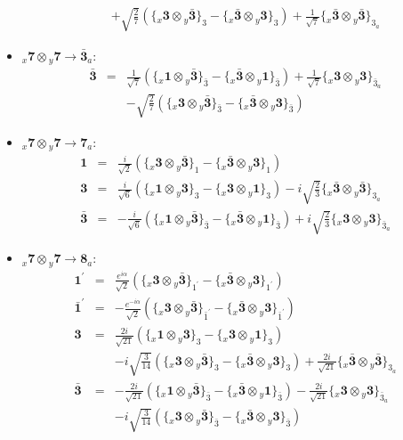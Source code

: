 \documentclass[english]{article}
\newcommand{\rep}[1]{\mathbf{#1}}
\newcommand{\repx}[2]{{}_{#2}\mathbf{#1}}
\newcommand{\subcg}[3]{\big\{ \repx{#1}{x}\otimes\repx{#2}{y}\big\}^{}_{#3}}
\begin{document}
\begin{itemize}
\begin{eqnarray*}
 & & +\sqrt{\frac{2}{7}}\left(\subcg{3}{\bar{3}}{3}-\subcg{\bar{3}}{3}{3}\right)+\frac{1}{\sqrt{7}}\subcg{\bar{3}}{\bar{3}}{3_{a}}
\end{eqnarray*}
\item $\repx{7}{x}\otimes\repx{7}{y}\to\rep{\bar{3}}_{a}$:
\begin{eqnarray*}
\rep{\bar{3}} &=& \frac{1}{\sqrt{7}}\left(\subcg{1}{\bar{3}}{\bar{3}}-\subcg{\bar{3}}{1}{\bar{3}}\right)+\frac{1}{\sqrt{7}}\subcg{3}{3}{\bar{3}_{a}} \\ 
 & & -\sqrt{\frac{2}{7}}\left(\subcg{3}{\bar{3}}{\bar{3}}-\subcg{\bar{3}}{3}{\bar{3}}\right)
\end{eqnarray*}
\item $\repx{7}{x}\otimes\repx{7}{y}\to\rep{7}_{a}$:
\begin{eqnarray*}
\rep{1} &=& \frac{i}{\sqrt{2}}\left(\subcg{3}{\bar{3}}{1}-\subcg{\bar{3}}{3}{1}\right)
\\
\rep{3} &=& \frac{i}{\sqrt{6}}\left(\subcg{1}{3}{3}-\subcg{3}{1}{3}\right)-i \sqrt{\frac{2}{3}}\subcg{\bar{3}}{\bar{3}}{3_{a}}
\\
\rep{\bar{3}} &=& -\frac{i}{\sqrt{6}}\left(\subcg{1}{\bar{3}}{\bar{3}}-\subcg{\bar{3}}{1}{\bar{3}}\right)+i \sqrt{\frac{2}{3}}\subcg{3}{3}{\bar{3}_{a}}
\end{eqnarray*}
\item $\repx{7}{x}\otimes\repx{7}{y}\to\rep{8}_{a}$:
\begin{eqnarray*}
\rep{1^{\prime}} &=& \frac{e^{i \alpha }}{\sqrt{2}}\left(\subcg{3}{\bar{3}}{1^{\prime}}-\subcg{\bar{3}}{3}{1^{\prime}}\right)
\\
\rep{\bar{1}^{\prime}} &=& -\frac{e^{-i \alpha }}{\sqrt{2}}\left(\subcg{3}{\bar{3}}{\bar{1}^{\prime}}-\subcg{\bar{3}}{3}{\bar{1}^{\prime}}\right)
\\
\rep{3} &=& \frac{2 i}{\sqrt{21}}\left(\subcg{1}{3}{3}-\subcg{3}{1}{3}\right) \\ 
 & & -i \sqrt{\frac{3}{14}}\left(\subcg{3}{\bar{3}}{3}-\subcg{\bar{3}}{3}{3}\right)+\frac{2 i}{\sqrt{21}}\subcg{\bar{3}}{\bar{3}}{3_{a}}
\\
\rep{\bar{3}} &=& -\frac{2 i}{\sqrt{21}}\left(\subcg{1}{\bar{3}}{\bar{3}}-\subcg{\bar{3}}{1}{\bar{3}}\right)-\frac{2 i}{\sqrt{21}}\subcg{3}{3}{\bar{3}_{a}} \\ 
 & & -i \sqrt{\frac{3}{14}}\left(\subcg{3}{\bar{3}}{\bar{3}}-\subcg{\bar{3}}{3}{\bar{3}}\right)
\end{eqnarray*}
\end{itemize}
\end{document}
